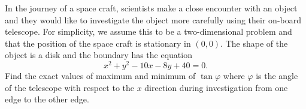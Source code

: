 In the journey of a space craft, scientists make a close encounter with an
object and they would like to investigate the object more carefully using their
on-board telescope. For simplicity, we assume this to be a two-dimensional
problem and that the position of the space craft is stationary in $(0,0)$. The
shape of the object is a disk and the boundary has the equation
\[ x^2 + y^2 - 10x - 8y + 40 = 0. \]
Find the exact values of maximum and minimum of $\tan\varphi$ where $\varphi$
is the angle of the telescope with respect to the $x$ direction during
investigation from one edge to the other edge.
